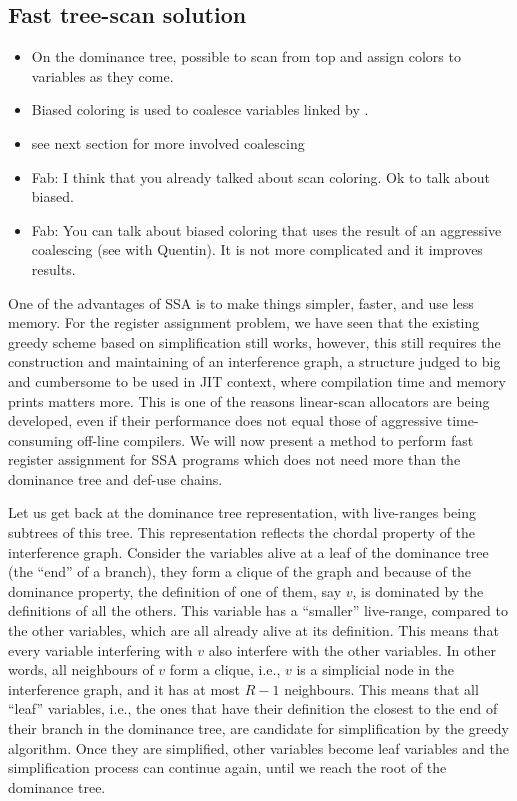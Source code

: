 {\subsection{Fast tree-scan solution}
{\sl
\begin{itemize}
  \item On the dominance tree, possible to scan from top and assign colors to 
    variables as they come.
  \item Biased coloring is used to coalesce variables linked by \phifuns.
  \item see next section for more involved coalescing
  \item Fab: I think that you already talked about scan coloring. Ok to talk about biased.
  \item Fab: You can talk about biased coloring that uses the result of an aggressive coalescing (see with Quentin). It is not more complicated and it improves results.
\end{itemize}
}

One of the advantages of SSA is to make things simpler, faster, and use less 
memory. For the register assignment problem, we have seen that the existing 
greedy scheme based on simplification still works, however, this still requires 
the construction and maintaining of an interference graph, a structure judged 
to big and cumbersome to be used in JIT context, where compilation time and 
memory prints matters more. This is one of the reasons linear-scan allocators 
are being developed, even if their performance does not equal those of 
aggressive time-consuming off-line compilers. We will now present a method to 
perform fast register assignment for SSA programs which does not need more than 
the dominance tree and def-use chains.

Let us get back at the dominance tree representation, with live-ranges being 
subtrees of this tree. This representation reflects the chordal property of the 
interference graph. Consider the variables alive at a leaf of the dominance 
tree (the ``end'' of a branch), they form a clique of the graph and because of 
the dominance property, the definition of one of them, say $v$, is dominated by 
the definitions of all the others.  This variable has a ``smaller'' live-range, 
compared to the other variables, which are all already alive at its definition.  
This means that every variable interfering with $v$ also interfere with the 
other variables. In other words, all neighbours of $v$ form a clique, i.e., $v$ 
is a simplicial node in the interference graph, and it has at most $R-1$ 
neighbours.  This means that all ``leaf'' variables, i.e., the ones that have 
their definition the closest to the end of their branch in the dominance tree, 
are candidate for simplification by the greedy algorithm. Once they are 
simplified, other variables become leaf variables and the simplification 
process can continue again, until we reach the root of the dominance tree.

}
